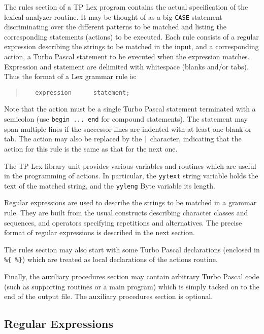 The rules section of a TP Lex program contains the actual specification of
the lexical analyzer routine. It may be thought of as a big \verb"CASE"
statement discriminating over the different patterns to be matched and listing the
corresponding statements (actions) to be executed. Each rule consists of a
regular expression describing the strings to be matched in the input, and a
corresponding action, a Turbo Pascal statement to be executed when the
expression matches. Expression and statement are delimited with whitespace
(blanks and/or tabs). Thus the format of a Lex grammar rule is:

\begin{quote}\begin{verbatim}
   expression      statement;
\end{verbatim}\end{quote}

Note that the action must be a single Turbo Pascal statement terminated
with a semicolon (use \verb"begin ... end" for compound statements). The
statement may span multiple lines if the successor lines are indented with
at least one blank or tab. The action may also be replaced by the \verb"|"
character, indicating that the action for this rule is the same as that for
the next one.

The TP Lex library unit provides various variables and routines which are
useful in the programming of actions. In particular, the \verb"yytext" string
variable holds the text of the matched string, and the \verb"yyleng" Byte
variable its length.

Regular expressions are used to describe the strings to be matched in a
grammar rule. They are built from the usual constructs describing character
classes and sequences, and operators specifying repetitions and alternatives.
The precise format of regular expressions is described in the next section.

The rules section may also start with some Turbo Pascal declarations
(enclosed in \verb"%{ %}") which are treated as local declarations of the
actions routine.

Finally, the auxiliary procedures section may contain arbitrary Turbo
Pascal code (such as supporting routines or a main program) which is
simply tacked on to the end of the output file. The auxiliary procedures
section is optional.

\subsection{Regular Expressions}

